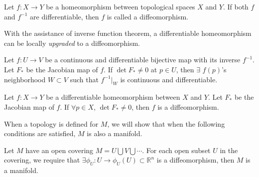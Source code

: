 \documentclass[11pt, a4paper]{book}
\begin{document}
\begin{Definition}[Diffeomorphism]
  Let $f: X \rightarrow Y$ be a homeomorphism between topological spaces $X$ and
  $Y$. If both $f$ and $f^{-1}$ are differentiable, then $f$ is called a
  diffeomorphism.
\end{Definition}

With the assistance of inverse function theorem, a differentiable homeomorphism can be
locally \textit{upgraded} to a diffeomorphism.

\begin{Theorem}
  \label{theo:inv-func}
  Let $f: U \rightarrow V$ be a continuous and differentiable bijective map with
  its inverse $f^{-1}$. Let $F_{*}$ be the Jacobian map of $f$. If $\det{F_{*}}
  \neq 0$ at $p \in U$, then $\exists$ $f(p)$'s neighborhood $W \subset V$
  such that $f^{-1}\big\vert_{W}$ is continuous and differentiable.
\end{Theorem}


\begin{Proposition}
  \label{prop:jacobi-and-diffeomorphism}
  Let $f: X \rightarrow Y$ be a differentiable homeomorphism between $X$ and
  $Y$. Let $F_{*}$ be the Jacobian map of $f$. If $\forall p \in X$, $\det{F_{*}}
  \neq 0$, then $f$ is a diffeomorphism.
\end{Proposition}

When a topology is defined for $M$, we will show that when the following
conditions are satisfied, $M$ is also a manifold.

\begin{Proposition}
  \label{prop:local-diffeomorphism-and-manifold}
  Let $M$ have an open covering $M=U \bigcup V \bigcup \cdots$. For each open
  subset $U$ in the covering, we require that $\exists \phi_U: U \rightarrow
  \phi_U(U) \subset \mathbb{R}^n$ is a diffeomorphism, then $M$ is a manifold.
\end{Proposition}
\end{document}
